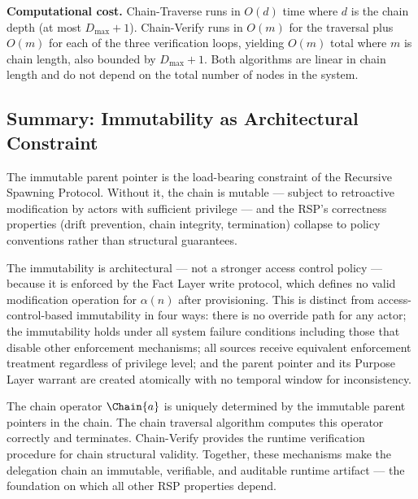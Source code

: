 \medskip
\noindent\textbf{Computational cost.} Chain-Traverse runs in $O(d)$ time where $d$ is the chain depth (at most $D_{\max} + 1$). Chain-Verify runs in $O(m)$ for the traversal plus $O(m)$ for each of the three verification loops, yielding $O(m)$ total where $m$ is chain length, also bounded by $D_{\max} + 1$. Both algorithms are linear in chain length and do not depend on the total number of nodes in the system.

\subsection{Summary: Immutability as Architectural Constraint}
\label{sec:immutability-summary}

The immutable parent pointer is the load-bearing constraint of the Recursive Spawning Protocol. Without it, the chain is mutable --- subject to retroactive modification by actors with sufficient privilege --- and the RSP's correctness properties (drift prevention, chain integrity, termination) collapse to policy conventions rather than structural guarantees.

The immutability is architectural --- not a stronger access control policy --- because it is enforced by the Fact Layer write protocol, which defines no valid modification operation for $\alpha(n)$ after provisioning. This is distinct from access-control-based immutability in four ways: there is no override path for any actor; the immutability holds under all system failure conditions including those that disable other enforcement mechanisms; all sources receive equivalent enforcement treatment regardless of privilege level; and the parent pointer and its Purpose Layer warrant are created atomically with no temporal window for inconsistency.

The chain operator $\Chain{a}$ is uniquely determined by the immutable parent pointers in the chain. The chain traversal algorithm computes this operator correctly and terminates. Chain-Verify provides the runtime verification procedure for chain structural validity. Together, these mechanisms make the delegation chain an immutable, verifiable, and auditable runtime artifact --- the foundation on which all other RSP properties depend.